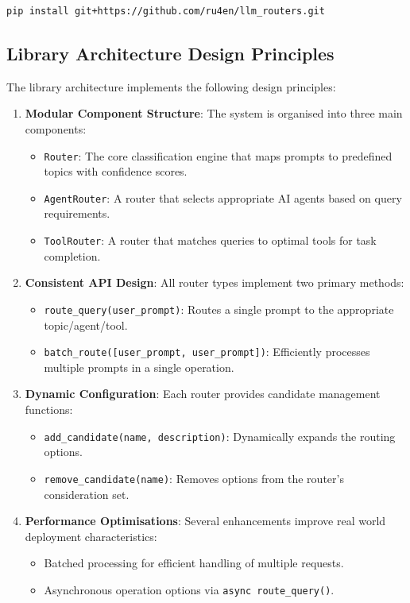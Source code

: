 \begin{verbatim}
pip install git+https://github.com/ru4en/llm_routers.git
\end{verbatim}


\subsection{Library Architecture Design Principles}

The library architecture implements the following design principles:

\begin{enumerate}
    \item \textbf{Modular Component Structure}: The system is organised into three main components:
    \begin{itemize}
        \item \texttt{Router}: The core classification engine that maps prompts to predefined topics with confidence scores.
        \item \texttt{AgentRouter}: A router that selects appropriate AI agents based on query requirements.
        \item \texttt{ToolRouter}: A router that matches queries to optimal tools for task completion.
    \end{itemize}

    \item \textbf{Consistent API Design}: All router types implement two primary methods:
    \begin{itemize}
        \item \texttt{route\_query(user\_prompt)}: Routes a single prompt to the appropriate topic/agent/tool.
        \item \texttt{batch\_route([user\_prompt, user\_prompt])}: Efficiently processes multiple prompts in a single operation.
    \end{itemize}

    \item \textbf{Dynamic Configuration}: Each router provides candidate management functions:
    \begin{itemize}
        \item \texttt{add\_candidate(name, description)}: Dynamically expands the routing options.
        \item \texttt{remove\_candidate(name)}: Removes options from the router's consideration set.
    \end{itemize}

    \item \textbf{Performance Optimisations}: Several enhancements improve real world deployment characteristics:
    \begin{itemize}
        \item Batched processing for efficient handling of multiple requests.
        \item Asynchronous operation options via \texttt{async route\_query()}.
    \end{itemize}
\end{enumerate}

